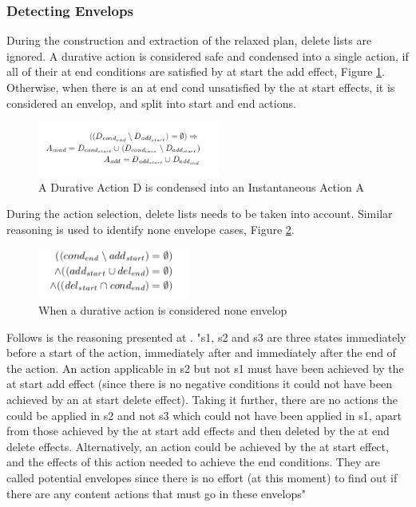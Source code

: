 \documentclass
[a4paper
,english
,parskip=half
,bibliography=totoc
]{scrreprt}
\begin{document}
        \subsubsection{Detecting Envelops}
        During the construction and extraction of the relaxed plan, delete lists are ignored. A durative action is considered safe and condensed into a single action, if all of their at end conditions are satisfied by at start the add effect, Figure \ref{fig:none_env_rpg}. Otherwise, when there is an at end cond unsatisfied by the at start effects, it is considered an envelop, and split into start and end actions.
         \begin{figure}[h]
            \centering    
            \includegraphics[width=6cm]{env_RPG.png}
            \caption{A Durative Action D is condensed into an Instantaneous Action A}
             \label{fig:none_env_rpg}
        \end{figure}


        During the action selection, delete lists needs to be taken into account. Similar reasoning is used to identify none envelope cases, Figure \ref{fig:none_env_selection}.
          \begin{figure}[h]
            \centering    
            \includegraphics[width=5cm]{env_selection.png}
            \caption{When a durative action is considered none envelop}
             \label{fig:none_env_selection}
        \end{figure}

         Follows is the reasoning presented at \citep{crikey_1}. "s1, s2 and s3 are three states immediately before a start of the action, immediately after and immediately after the end of the action. An action applicable in s2 but not s1 must have been achieved by the at start add effect (since there is no negative conditions it could not have been achieved by an at start delete effect). Taking it further, there are no actions the could be applied in s2 and not s3 which could not have been applied in s1, apart from those achieved by the at start add effects and then deleted by the at end delete effects. Alternatively, an action could be achieved by the at start effect, and the effects of this action needed to achieve the end conditions. They are called potential envelopes since there is no effort (at this moment) to find out if there are any content actions that must go in these envelops"
\end{document}
